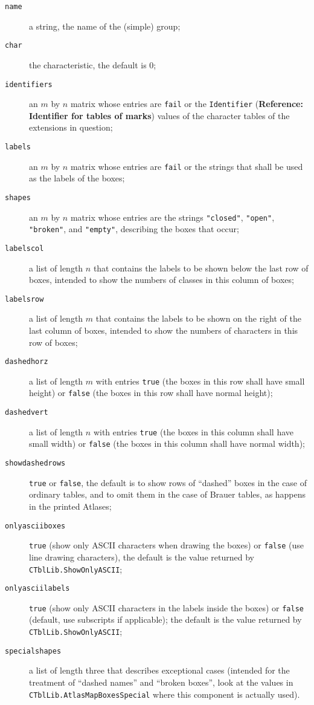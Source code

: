 \documentclass[a4paper,11pt]{report}
\begin{document}
{{{ 
\begin{description}
\item[{\texttt{name}}]  a string, the name of the (simple) group; 
\item[{\texttt{char}}]  the characteristic, the default is $0$; 
\item[{\texttt{identifiers}}]  an $m$ by $n$ matrix whose entries are \texttt{fail} or the \texttt{Identifier} (\textbf{Reference: Identifier for tables of marks}) values of the character tables of the extensions in question; 
\item[{\texttt{labels}}]  an $m$ by $n$ matrix whose entries are \texttt{fail} or the strings that shall be used as the labels of the boxes; 
\item[{\texttt{shapes}}]  an $m$ by $n$ matrix whose entries are the strings \texttt{"closed"}, \texttt{"open"}, \texttt{"broken"}, and \texttt{"empty"}, describing the boxes that occur; 
\item[{\texttt{labelscol}}]  a list of length $n$ that contains the labels to be shown below the last row of boxes, intended to
show the numbers of classes in this column of boxes; 
\item[{\texttt{labelsrow}}]  a list of length $m$ that contains the labels to be shown on the right of the last column of boxes,
intended to show the numbers of characters in this row of boxes; 
\item[{\texttt{dashedhorz}}]  a list of length $m$ with entries \texttt{true} (the boxes in this row shall have small height) or \texttt{false} (the boxes in this row shall have normal height); 
\item[{\texttt{dashedvert}}]  a list of length $n$ with entries \texttt{true} (the boxes in this column shall have small width) or \texttt{false} (the boxes in this column shall have normal width); 
\item[{\texttt{showdashedrows}}]  \texttt{true} or \texttt{false}, the default is to show rows of ``dashed'' boxes in the case of ordinary tables, and to omit them in the case of Brauer
tables, as happens in the printed Atlases; 
\item[{\texttt{onlyasciiboxes}}]  \texttt{true} (show only ASCII characters when drawing the boxes) or \texttt{false} (use line drawing characters), the default is the value returned by \texttt{CTblLib.ShowOnlyASCII}; 
\item[{\texttt{onlyasciilabels}}]  \texttt{true} (show only ASCII characters in the labels inside the boxes) or \texttt{false} (default, use subscripts if applicable); the default is the value returned by \texttt{CTblLib.ShowOnlyASCII}; 
\item[{\texttt{specialshapes}}]  a list of length three that describes exceptional cases (intended for the
treatment of ``dashed names'' and ``broken boxes'', look at the values in \texttt{CTblLib.AtlasMapBoxesSpecial} where this component is actually used). 
\end{description}
 }

}}
\end{document}
